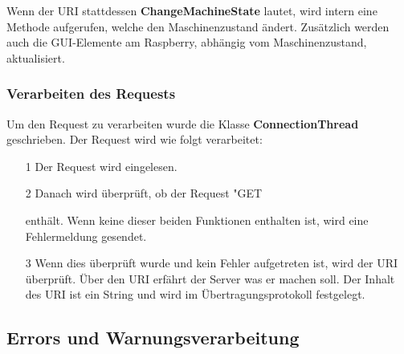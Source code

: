 \vspace{10pt}

Wenn der URI stattdessen \textbf{ChangeMachineState} lautet, wird intern eine Methode aufgerufen, welche den Maschinenzustand ändert. Zusätzlich werden auch die \ac{GUI}-Elemente am Raspberry, abhängig vom Maschinenzustand, aktualisiert.

\subsubsection{Verarbeiten des Requests}
Um den Request zu verarbeiten wurde die Klasse \textbf{ConnectionThread} geschrieben. Der Request wird wie folgt verarbeitet:
\begin{itemize}
\item[1] Der Request wird eingelesen.
\item[2] Danach wird überprüft, ob der Request "GET\grqq{}  enthält. Wenn keine dieser beiden Funktionen enthalten ist, wird eine Fehlermeldung gesendet.
\item[3] Wenn dies überprüft wurde und kein Fehler aufgetreten ist, wird der \ac{URI} überprüft. Über den \ac{URI} erfährt der Server was er machen soll. Der Inhalt des \ac{URI} ist ein String und wird im Übertragungsprotokoll festgelegt.
\end{itemize}

\subsection{Errors und Warnungsverarbeitung}
